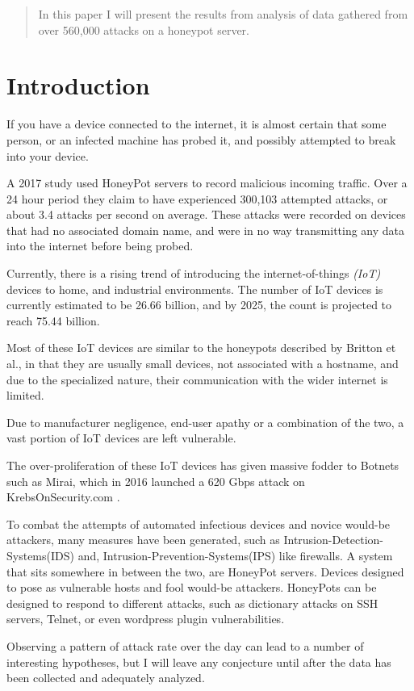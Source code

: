 
\begin{abstract}
    In this paper I will present the results 
    from analysis of data gathered from over
    560,000 attacks on a honeypot server.
    

\end{abstract}
%
%
%
\section{Introduction}
\label{sec:introduction}

    If you have a device connected to the
    internet, it is almost certain that some person,
    or an infected machine has probed it, and possibly
    attempted to break into your device. 


    A 2017 study \cite{Britton_Liu}
    used HoneyPot servers to record malicious
    incoming traffic. Over a 24 hour period they 
    claim to have experienced 300,103 attempted
    attacks, or about 3.4 attacks per second 
    on average. These attacks were recorded on 
    devices that had no associated domain name, 
    and were in no way transmitting any data 
    into the internet before being probed.

    
    Currently, there is a rising trend of introducing
    the internet-of-things \textit{(IoT)} devices to 
    home, and industrial environments. The number of 
    IoT devices is currently estimated to be 26.66 
    billion, and by 2025, the count is projected to 
    reach 75.44 billion. \cite{statista}

    
    Most of these IoT devices are similar to the honeypots
    described by Britton et al.\cite{Britton_Liu}, in that 
    they are usually small devices, not associated with 
    a hostname, and due to the specialized nature, their 
    communication with the wider internet is limited.


    Due to manufacturer negligence, end-user apathy or 
    a combination of the two, a vast portion of IoT devices
    are left vulnerable.

    The over-proliferation of these IoT devices has given 
    massive fodder to Botnets such as Mirai, which in 2016
    launched a 620 Gbps attack on KrebsOnSecurity.com
    \cite{Brian_Krebs_2016}.


    To combat the attempts of automated infectious devices
    and novice would-be attackers, many measures have been
    generated, such as Intrusion-Detection-Systems(IDS)
    \cite{4693640} and, Intrusion-Prevention-Systems(IPS) like 
    firewalls. A system that sits somewhere in between the
    two, are HoneyPot servers. Devices designed to pose as
    vulnerable hosts and fool would-be attackers. 
    HoneyPots can be designed to respond to 
    different attacks, such as dictionary attacks on SSH servers,
    Telnet, or even wordpress plugin vulnerabilities.

    
    Observing a pattern of attack rate over the day can lead
    to a number of interesting hypotheses, but I will leave any
    conjecture until after the data has been collected and 
    adequately analyzed.

    
    